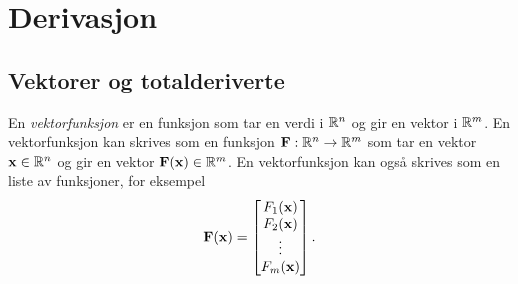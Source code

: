 \section{Derivasjon}
\subsection{Vektorer og totalderiverte}
En {\em vektorfunksjon} er en funksjon som tar en verdi i $\mathbb{R}^n$ og gir en
vektor i $\mathbb{R}^m$. En vektorfunksjon kan skrives som en funksjon
$\mathbf{F}:\mathbb{R}^n\to\mathbb{R}^m$ som tar en vektor $\mathbf{x}\in\mathbb{R}^n$ og gir en vektor
$\mathbf{F}(\mathbf{x})\in\mathbb{R}^m$. En vektorfunksjon kan også skrives som en liste av
funksjoner, for eksempel
$$\mathbf{F}(\mathbf{x}) = \begin{bmatrix} F_1(\mathbf{x}) \\ F_2(\mathbf{x}) \\ \vdots \\ F_m(\mathbf{x}) \end{bmatrix}.$$

